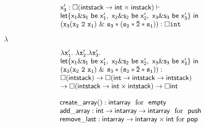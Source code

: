 \documentclass[10pt]{book}
\begin{document}
\begin{mdSnippets}
\begin{mdDisplaySnippet}[b93d6314eb77d05be08e548d9f9974c3]
\[\begin{array}{l}
   {\sf x_3^{\prime}: \Box  (intstack\rightarrow int\times instack)}\vdash \\
        {\sf  let\{ x_1\& s_1 {\ \sf be \ } x_1^{\prime},
         \ x_2\& s_2 {\ \sf be \ } x_2^{\prime}, \  x_3\& s_3 
         {\ \sf be \ } x_3^{\prime} \}\  in}\ \\   
         \mathtt{(x_3 (x_2\ 2 \ x_1)\ \& \ s_3*(s_2* \bar{2}*s_1)):\Box int} 
\end{array}
\]%
\end{mdDisplaySnippet}%
\begin{mdInlineSnippet}[c6a6eb61fd9c6c913da73b3642ca147d]%
$\lambda$\end{mdInlineSnippet}%
\begin{mdDisplaySnippet}%
\[%
\begin{array}{l l}
\mathtt{\lambda x_1^{\prime}.\  \lambda x_2^{\prime}. \lambda x_3^{\prime}}. \\
                 {\sf  let\{ x_1\& s_1 {\ \sf be \ } x_1^{\prime},
       \ x_2\& s_2 {\ \sf be \ } x_2^{\prime}, \  x_3\& s_3 
       {\ \sf be \ } x_3^{\prime} \}\  in}\ \\   
       \mathtt{(x_3 (x_2\ 2 \ x_1)\ \& \ s_3*(s_2* \bar{2}*s_1)):}\\
           {\sf \Box(intstack)\rightarrow 
            \Box(int\rightarrow intstack\rightarrow intstack)} \\
           {\sf \rightarrow \Box (intstack\rightarrow int\times intstack) \rightarrow \Box int}
\end{array}
\]%
\end{mdDisplaySnippet}%
\begin{mdDisplaySnippet}[0e8f9bfe4d65c71c645a8b474e5916bc]%
\[%
\begin{array}{l}
{ \sf create\_array(): intarray} \ \  \text{for}\ \ {\sf empty}\\
  {\sf add\_array: int \rightarrow intarray\rightarrow intarray}\ \  \text{for} \ \ {\sf push}\\
{\sf remove\_last: intarray\rightarrow intarray\times int }\  \text{for}\  {\sf pop}
\end{array}
\]%
\end{mdDisplaySnippet}%
\begin{mdDisplaySnippet}[97210db0216d148c80d2a671ff4f1a84]%
\[%
  \begin{array}{l}

\end{array}\]
\end{mdDisplaySnippet}
\end{mdSnippets}
\end{document}
